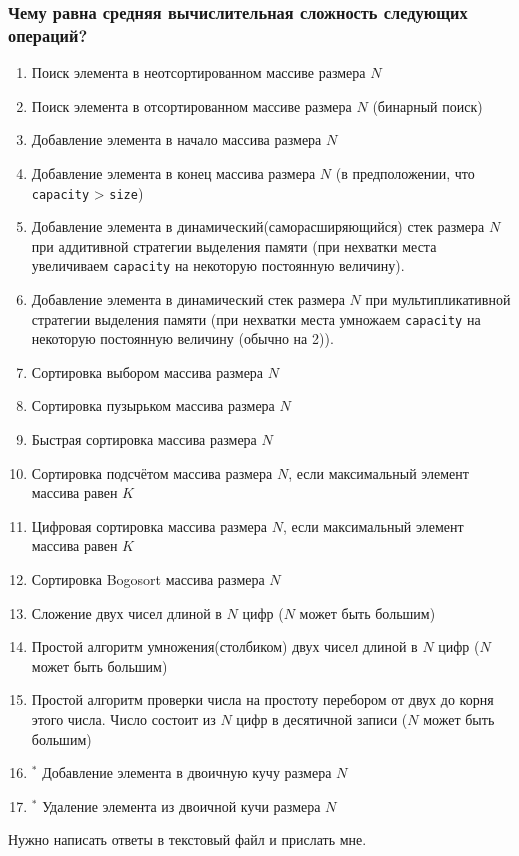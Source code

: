\documentclass{article}
\begin{document}
\subsubsection*{Чему равна средняя вычислительная сложность следующих операций?}
\begin{enumerate}
\item Поиск элемента в неотсортированном массиве размера $N$
\item Поиск элемента в отсортированном массиве размера $N$ (бинарный поиск)
\item Добавление элемента в начало массива размера $N$
\item Добавление элемента в конец массива размера $N$ (в предположении, что \texttt{capacity} > \texttt{size})
\item Добавление элемента в динамический(саморасширяющийся) стек размера $N$  при аддитивной стратегии выделения памяти (при нехватки места увеличиваем \texttt{capacity} на некоторую постоянную величину).
\item Добавление элемента в динамический стек размера $N$ при мультипликативной стратегии выделения памяти (при нехватки места умножаем \texttt{capacity} на некоторую постоянную величину (обычно на 2)).
\item Сортировка выбором массива размера $N$
\item Сортировка пузырьком массива размера $N$
\item Быстрая сортировка массива размера $N$
\item Сортировка подсчётом массива размера $N$, если максимальный элемент массива равен $K$
\item Цифровая сортировка массива размера $N$, если максимальный элемент массива равен $K$
\item Сортировка Bogosort массива размера $N$
\item Сложение двух чисел длиной в $N$ цифр ($N$ может быть большим)
\item Простой алгоритм умножения(столбиком) двух чисел длиной в $N$ цифр ($N$ может быть большим)
\item Простой алгоритм проверки числа на простоту перебором от двух до корня этого числа. Число состоит из $N$ цифр в десятичной записи ($N$ может быть большим)
\item $\!\!\!\!{^*}$ Добавление элемента в двоичную кучу размера $N$
\item $\!\!\!\!{^*}$ Удаление элемента из двоичной кучи размера $N$
\end{enumerate}
Нужно написать ответы в текстовый файл и прислать мне.
\newpage
\end{document}
